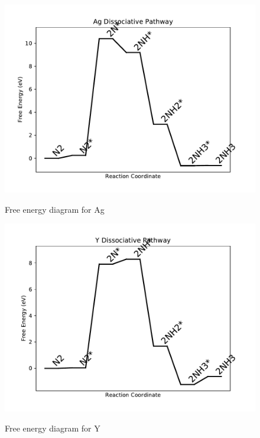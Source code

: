 \documentclass{article}
\begin{document}
\newpage
\begin{figure}
\includegraphics[width=1\linewidth]{data/plots/Ag_dissociative.pdf}
\label{fig:Ag_dissociative}
\caption{Free energy diagram for Ag}
\end{figure}

\begin{figure}
\includegraphics[width=1\linewidth]{data/plots/Y_dissociative.pdf}
\label{fig:Y_dissociative}
\caption{Free energy diagram for Y}
\end{figure}
\end{document}
